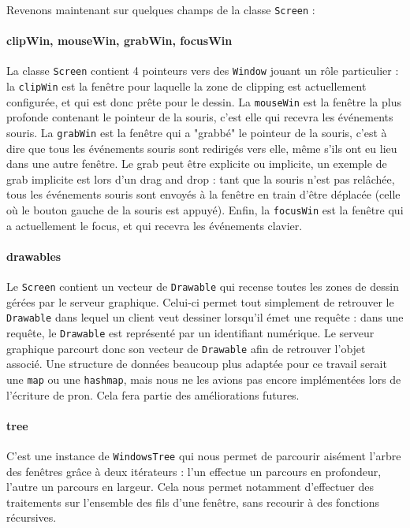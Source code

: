 Revenons maintenant sur quelques champs de la classe \verb|Screen| :

\paragraph{clipWin, mouseWin, grabWin, focusWin}
La classe \verb|Screen| contient 4 pointeurs vers des \verb|Window| jouant un rôle particulier : la \verb|clipWin| est la fenêtre pour laquelle la zone de clipping est actuellement configurée, et qui est donc prête pour le dessin. La \verb|mouseWin| est la fenêtre la plus profonde contenant le pointeur de la souris, c'est elle qui recevra les événements souris. La \verb|grabWin| est la fenêtre qui a "grabbé" le pointeur de la souris, c'est à dire que tous les événements souris sont redirigés vers elle, même s'ils ont eu lieu dans une autre fenêtre. Le grab peut être explicite ou implicite, un exemple de grab implicite est lors d'un drag and drop : tant que la souris n'est pas relâchée, tous les événements souris sont envoyés à la fenêtre en train d'être déplacée (celle où le bouton gauche de la souris est appuyé). Enfin, la \verb|focusWin| est la fenêtre qui a actuellement le focus, et qui recevra les événements clavier.

\paragraph{drawables}
Le \verb|Screen| contient un vecteur de \verb|Drawable| qui recense toutes les zones de dessin gérées par le serveur graphique. Celui-ci permet tout simplement de retrouver le \verb|Drawable| dans lequel un client veut dessiner lorsqu'il émet une requête : dans une requête, le \verb|Drawable| est représenté par un identifiant numérique. Le serveur graphique parcourt donc son vecteur de \verb|Drawable| afin de retrouver l'objet associé. Une structure de données beaucoup plus adaptée pour ce travail serait une \verb|map| ou une \verb|hashmap|, mais nous ne les avions pas encore implémentées lors de l'écriture de pron. Cela fera partie des améliorations futures.

\paragraph{tree}
C'est une instance de \verb|WindowsTree| qui nous permet de parcourir aisément l'arbre des fenêtres grâce à deux itérateurs : l'un effectue un parcours en profondeur, l'autre un parcours en largeur. Cela nous permet notamment d'effectuer des traitements sur l'ensemble des fils d'une fenêtre, sans recourir à des fonctions récursives.

